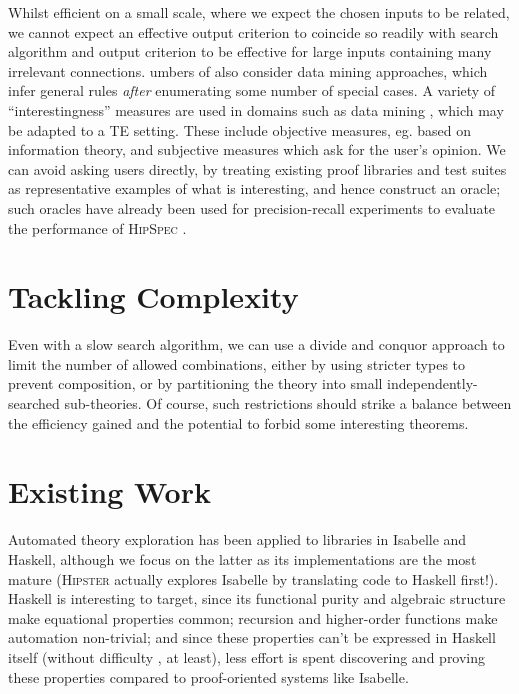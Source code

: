 \documentclass[]{article}
\begin{document}
Whilst efficient on a small scale, where we expect the chosen inputs to
be related, we cannot expect an effective output criterion to coincide
so readily with search algorithm and output criterion to be effective
for large inputs containing many irrelevant connections. umbers of also
consider data mining approaches, which infer general rules \emph{after}
enumerating some number of special cases. A variety of
``interestingness'' measures are used in domains such as data mining
\cite{geng2006interestingness}, which may be adapted to a TE setting. These
include objective measures, eg. based on information theory, and
subjective measures which ask for the user's opinion. We can avoid
asking users directly, by treating existing proof libraries and test
suites as representative examples of what is interesting, and hence
construct an oracle; such oracles have already been used for
precision-recall experiments to evaluate the performance of
\textsc{HipSpec} \cite{claessen2013automating}.

\section{Tackling Complexity}\label{tackling-complexity}

Even with a slow search algorithm, we can use a divide and conquor
approach to limit the number of allowed combinations, either by using
stricter types to prevent composition, or by partitioning the theory
into small independently-searched sub-theories. Of course, such
restrictions should strike a balance between the efficiency gained and
the potential to forbid some interesting theorems.

\section{Existing Work}\label{existing-work}

Automated theory exploration has been applied to libraries in Isabelle
and Haskell, although we focus on the latter as its implementations are
the most mature (\textsc{Hipster} actually explores Isabelle by
translating code to Haskell first!). Haskell is interesting to target,
since its functional purity and algebraic structure make equational
properties common; recursion and higher-order functions make automation
non-trivial; and since these properties can't be expressed in Haskell
itself (without difficulty \cite{lindley2014hasochism}, at least), less
effort is spent discovering and proving these properties compared to
proof-oriented systems like Isabelle.
\end{document}

